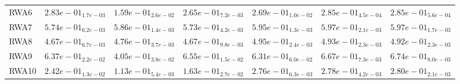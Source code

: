 \documentclass{article}
\begin{document}
\begin{table}
\begin{scriptsize}
\begin{tabular}{lllllll}
RWA6 & $  2.83e-01_{ 1.7e-03}$ & $  1.59e-01_{ 2.6e-02}$ & $  2.65e-01_{ 7.2e-03}$ & $  2.69e-01_{ 1.0e-02}$ & \cellcolor{gray25}$  2.85e-01_{ 4.5e-04}$ & \cellcolor{gray95}$  2.85e-01_{ 5.6e-04}$ \\
RWA7 & $  5.74e-01_{ 6.2e-03}$ & $  5.86e-01_{ 1.4e-03}$ & $  5.73e-01_{ 4.2e-03}$ & $  5.95e-01_{ 1.3e-03}$ & \cellcolor{gray95}$  5.97e-01_{ 2.1e-03}$ & \cellcolor{gray25}$  5.97e-01_{ 1.7e-03}$ \\
RWA8 & $  4.67e-01_{ 6.7e-03}$ & $  4.76e-01_{ 3.7e-03}$ & $  4.67e-01_{ 9.8e-03}$ & \cellcolor{gray95}$  4.95e-01_{ 2.4e-03}$ & \cellcolor{gray25}$  4.93e-01_{ 2.3e-03}$ & $  4.92e-01_{ 2.3e-03}$ \\
RWA9 & $  6.37e-01_{ 2.2e-02}$ & $  4.05e-01_{ 3.8e-02}$ & $  6.55e-01_{ 1.5e-02}$ & $  6.31e-01_{ 6.0e-02}$ & \cellcolor{gray25}$  6.67e-01_{ 7.3e-03}$ & \cellcolor{gray95}$  6.74e-01_{ 8.0e-03}$ \\
RWA10 & $  2.42e-01_{ 1.3e-02}$ & $  1.13e-01_{ 5.4e-03}$ & $  1.63e-01_{ 2.7e-02}$ & $  2.76e-01_{ 6.3e-03}$ & \cellcolor{gray25}$  2.78e-01_{ 4.2e-03}$ & \cellcolor{gray95}$  2.80e-01_{ 2.1e-03}$ \\
\hline
\end{tabular}
\end{scriptsize}
\end{table}
\end{document}
